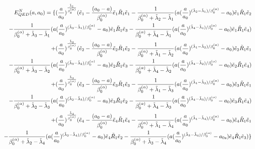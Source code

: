\documentclass[review]{elsarticle}
\begin{document}
\begin{eqnarray}
E_{QED}^{N}(a,a_{0})=\{(\frac{a}{a_{0}})^{\frac{\tilde{\lambda}_{1}}{ \beta^{(\alpha)}_{0}}}(\tilde{e}_{1}-\frac{(\text{\ensuremath{a_{0}-a)}}}{\text{\ensuremath{\beta^{(\alpha)}_{0}}}}\tilde{e}_{1}\tilde{R}_1\tilde{e}_{1}-\frac{1}{\beta^{(\alpha)}_{0}+\tilde{\lambda}_{2}-\tilde{\lambda}_{1}}(a(\frac{a}{a_{0}})^{(\tilde{\lambda}_{2}-\tilde{\lambda}_{1})/\beta^{(\alpha)}_{0}}-a_{0})\tilde{e}_{1}\tilde{R}_1\tilde{e}_{2}\cr
-\frac{1}{\beta^{(\alpha)}_{0}+\tilde{\lambda}_{3}-\tilde{\lambda}_{1}}(a(\frac{a}{a_{0}})^{(\tilde{\lambda}_{3}-\tilde{\lambda}_{1})/\beta^{(\alpha)}_{0}}-a_{0})\tilde{e}_{1}\tilde{R}_1\tilde{e}_{3}-\frac{1}{\beta^{(\alpha)}_{0}+\tilde{\lambda}_{4}-\tilde{\lambda}_{1}}(a(\frac{a}{a_{0}})^{(\tilde{\lambda}_{4}-\tilde{\lambda}_{1})/\beta^{(\alpha)}_{0}}-a_{0})\tilde{e}_{1}\tilde{R}_1\tilde{e}_{4})\cr
+(\frac{a}{a_{0}})^{\frac{\tilde{\lambda}_{2}}{\beta^{(\alpha)}_{0}}}(\tilde{e}_{2}-\frac{(\text{\ensuremath{a_{0}-a)}}}{\text{\ensuremath{\beta^{(\alpha)}_{0}}}}\tilde{e}_{2}\tilde{R}_1\tilde{e}_{2}-\frac{1}{\beta^{(\alpha)}_{0}+\tilde{\lambda}_{1}-\tilde{\lambda}_{2}}(a(\frac{a}{a_{0}})^{(\tilde{\lambda}_{1}-\tilde{\lambda}_{2})/\beta^{(\alpha)}_{0}}-a_{0})\tilde{e}_{2}\tilde{R}_1\tilde{e}_{1}\cr
-\frac{1}{\beta^{(\alpha)}_{0}+\tilde{\lambda}_{3}-\tilde{\lambda}_{2}}(a(\frac{a}{a_{0}})^{(\tilde{\lambda}_{3}-\tilde{\lambda}_{2})/\beta^{(\alpha)}_{0}}-a_{0})\tilde{e}_{2}\tilde{R}_1\tilde{e}_{3}-\frac{1}{\beta^{(\alpha)}_{0}+\tilde{\lambda}_{4}-\tilde{\lambda}_{2}}(a(\frac{a}{a_{0}})^{(\tilde{\lambda}_{4}-\tilde{\lambda}_{2})/\beta^{(\alpha)}_{0}}-a_{0})\tilde{e}_{2}\tilde{R}_1\tilde{e}_{4})\cr
+(\frac{a}{a_{0}})^{\frac{\tilde{\lambda}_{3}}{\beta^{(\alpha)}_{0}}}(\tilde{e}_{3}-\frac{(\text{\ensuremath{a_{0}-a)}}}{\text{\ensuremath{\beta^{(\alpha)}_{0}}}}\tilde{e}_{3}\tilde{R}_1\tilde{e}_{3}-\frac{1}{\beta^{(\alpha)}_{0}+\tilde{\lambda}_{1}-\tilde{\lambda}_{3}}(a(\frac{a}{a_{0}})^{(\tilde{\lambda}_{1}-\tilde{\lambda}_{3})/\beta^{(\alpha)}_{0}}-a_{0})\tilde{e}_{3}\tilde{R}_1\tilde{e}_{1}\cr
-\frac{1}{\beta^{(\alpha)}_{0}+\tilde{\lambda}_{2}-\tilde{\lambda}_{3}}(a(\frac{a}{a_{0}})^{(\tilde{\lambda}_{2}-\tilde{\lambda}_{3})/\beta^{(\alpha)}_{0}}-a_{0})\tilde{e}_{3}\tilde{R}_1\tilde{e}_{2}-\frac{1}{\beta^{(\alpha)}_{0}+\tilde{\lambda}_{4}-\tilde{\lambda}_{3}}(a(\frac{a}{a_{0}})^{(\tilde{\lambda}_{4}-\tilde{\lambda}_{3})/\beta^{(\alpha)}_{0}}-a_{0})\tilde{e}_{3}\tilde{R}_1\tilde{e}_{4})\cr
+(\frac{a}{a_{0}})^{\frac{\tilde{\lambda}_{4}}{\beta^{(\alpha)}_{0}}}(\tilde{e}_{4}-\frac{(\text{\ensuremath{a_{0}-a)}}}{\text{\ensuremath{\beta^{(\alpha)}_{0}}}}\tilde{e}_{4}\tilde{R}_1\tilde{e}_{4}-\frac{1}{\beta^{(\alpha)}_{0}+\tilde{\lambda}_{1}-\tilde{\lambda}_{4}}(a(\frac{a}{a_{0}})^{(\tilde{\lambda}_{1}-\tilde{\lambda}_{4})/\beta^{(\alpha)}_{0}}-a_{0})\tilde{e}_{4}\tilde{R}_1\tilde{e}_{1}\cr
-\frac{1}{\beta^{(\alpha)}_{0}+\tilde{\lambda}_{2}-\tilde{\lambda}_{4}}(a(\frac{a}{a_{0}})^{(\tilde{\lambda}_{2}-\tilde{\lambda}_{4})/\beta^{(\alpha)}_{0}}-a_{0})\tilde{e}_{4}\tilde{R}_1\tilde{e}_{2}-\frac{1}{\beta^{(\alpha)}_{0}+\tilde{\lambda}_{3}-\tilde{\lambda}_{4}}(a(\frac{a}{a_{0}})^{(\tilde{\lambda}_{3}-\tilde{\lambda}_{4})/\beta^{(\alpha)}_{0}}-a_{0s})\tilde{e}_{4}\tilde{R}_1\tilde{e}_{3})\}
\label{eq:49}
\end{eqnarray} 
\end{document}
